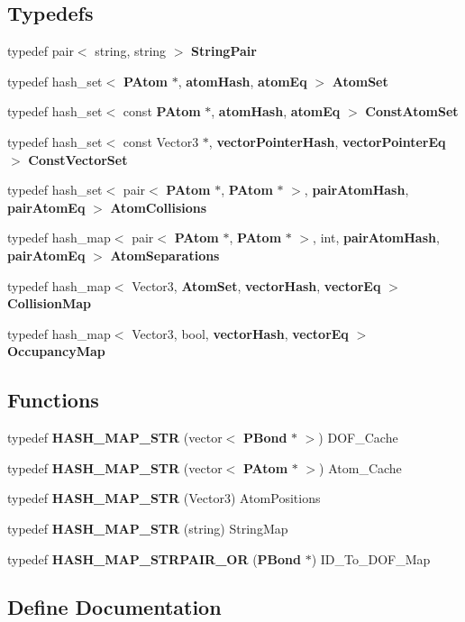 \subsection*{Typedefs}
\begin{CompactItemize}
\item 
typedef pair$<$ string, string $>$ {\bf String\-Pair}
\item 
typedef hash\_\-set$<$ {\bf PAtom} $\ast$, {\bf atom\-Hash}, {\bf atom\-Eq} $>$ {\bf Atom\-Set}
\item 
typedef hash\_\-set$<$ const {\bf PAtom} $\ast$, {\bf atom\-Hash}, {\bf atom\-Eq} $>$ {\bf Const\-Atom\-Set}
\item 
typedef hash\_\-set$<$ const Vector3 $\ast$, {\bf vector\-Pointer\-Hash}, {\bf vector\-Pointer\-Eq} $>$ {\bf Const\-Vector\-Set}
\item 
typedef hash\_\-set$<$ pair$<$ {\bf PAtom} $\ast$, {\bf PAtom} $\ast$ $>$, {\bf pair\-Atom\-Hash}, {\bf pair\-Atom\-Eq} $>$ {\bf Atom\-Collisions}
\item 
typedef hash\_\-map$<$ pair$<$ {\bf PAtom} $\ast$, {\bf PAtom} $\ast$ $>$, int, {\bf pair\-Atom\-Hash}, {\bf pair\-Atom\-Eq} $>$ {\bf Atom\-Separations}
\item 
typedef hash\_\-map$<$ Vector3, {\bf Atom\-Set}, {\bf vector\-Hash}, {\bf vector\-Eq} $>$ {\bf Collision\-Map}
\item 
typedef hash\_\-map$<$ Vector3, bool, {\bf vector\-Hash}, {\bf vector\-Eq} $>$ {\bf Occupancy\-Map}
\end{CompactItemize}
\subsection*{Functions}
\begin{CompactItemize}
\item 
typedef {\bf HASH\_\-MAP\_\-STR} (vector$<$ {\bf PBond} $\ast$ $>$) DOF\_\-Cache
\item 
typedef {\bf HASH\_\-MAP\_\-STR} (vector$<$ {\bf PAtom} $\ast$ $>$) Atom\_\-Cache
\item 
typedef {\bf HASH\_\-MAP\_\-STR} (Vector3) Atom\-Positions
\item 
typedef {\bf HASH\_\-MAP\_\-STR} (string) String\-Map
\item 
typedef {\bf HASH\_\-MAP\_\-STRPAIR\_\-OR} ({\bf PBond} $\ast$) ID\_\-To\_\-DOF\_\-Map
\end{CompactItemize}


\subsection{Define Documentation}
